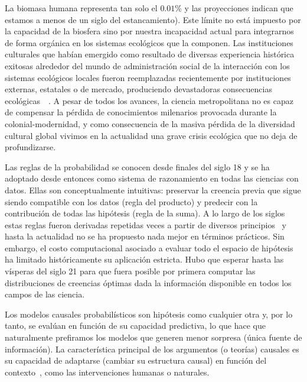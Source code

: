 \documentclass[11pt]{article}
\begin{document}

La biomasa humana representa tan solo el $0.01$\% y las proyecciones indican que estamos a menos de un siglo del estancamiento).
Este límite no está impuesto por la capacidad de la biosfera sino por nuestra incapacidad actual para integrarnos de forma orgánica en los sistemas ecológicos que la componen.
Las instituciones culturales que habían emergido como resultado de diversas experiencia histórica exitosas alrededor del mundo de administración social de la interacción con los sistemas ecológicos locales fueron reemplazadas recientemente por instituciones externas, estatales o de mercado, produciendo devastadoras consecuencias ecológicas~~\cite{ostrom2010, ostrom1990, segato2013-colonialidad}.
A pesar de todos los avances, la ciencia metropolitana no es capaz de compensar la pérdida de conocimientos milenarios provocada durante la colonial-modernidad, y como consecuencia de la masiva pérdida de la diversidad cultural global vivimos en la actualidad una grave crisis ecológica que no deja de profundizarse.


Las reglas de la probabilidad se conocen desde finales del siglo 18 y se ha adoptado desde entonces como sistema de razonamiento en todas las ciencias con datos.
Ellas son conceptualmente intuitivas: preservar la creencia previa que sigue siendo compatible con los datos (regla del producto) y predecir con la contribución de todas las hipótesis (regla de la suma).
A lo largo de los siglos estas reglas fueron derivadas repetidas veces a partir de diversos principios~\cite{halpern2017-RAU2} y hasta la actualidad no se ha propuesto nada mejor en términos prácticos.
Sin embargo, el costo computacional asociado a evaluar todo el espacio de hipótesis ha limitado históricamente su aplicación estricta.
Hubo que esperar hasta las vísperas del siglo 21 para que fuera posible por primera computar las distribuciones de creencias óptimas dada la información disponible en todos los campos de las ciencia.


Los modelos causales probabilísticos son hipótesis como cualquier otra y, por lo tanto, se evalúan en función de su capacidad predictiva, lo que hace que naturalmente prefiramos los modelos que generen menor sorpresa (única fuente de información).
La característica principal de los argumentos (o teorías) causales es su capacidad de adaptarse (cambiar su estructura causal) en función del contexto~\cite{winn2012-causality}, como las intervenciones humanas o naturales.
\end{document}
